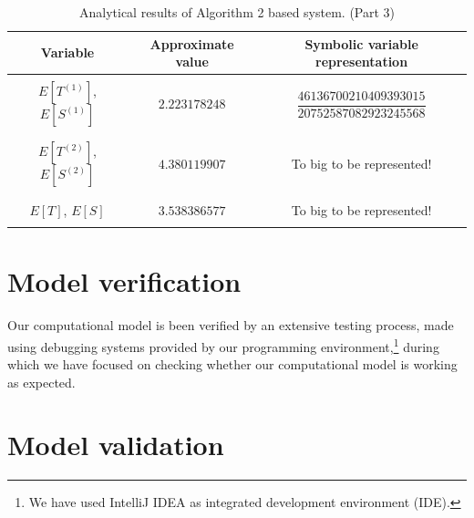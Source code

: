 \documentclass[10pt,a4paper]{article}
\begin{document}
\begin{table}[h!]
\caption{Analytical results of Algorithm 2 based system. (Part 3)}
\begin{adjustbox}{center=\textwidth}
	
     \begin{tabular}{c|c|c}
     \toprule
     \textbf{Variable} & \textbf{Approximate value} & \textbf{Symbolic variable representation} \\
     \toprule
	 
	 &&\\


	 $E[T^{(1)}]$, $E[S^{(1)}]$ & $2.223178248$ & $\dfrac{46136700210409393015}{20752587082923245568}$  \\

	 &&\\\hline &&\\

	 $E[T^{(2)}]$, $E[S^{(2)}]$ & $4.380119907$ & To big to be represented!  \\

	 &&\\\hline &&\\

	 $E[T]$, $E[S]$ & $3.538386577$ & To big to be represented!  \\

	 &&\\

     \bottomrule

    \end{tabular}
    \end{adjustbox}
\end{table}


\clearpage
\newpage
\section{Model verification}

Our computational model is been verified by an extensive testing process, made using debugging systems provided by our programming environment,\footnote{We have used IntelliJ IDEA as integrated development environment (IDE).} during which we have focused on checking whether our computational model is working as expected.

\section{Model validation}\label{sec:ModelValidation}
\end{document}
